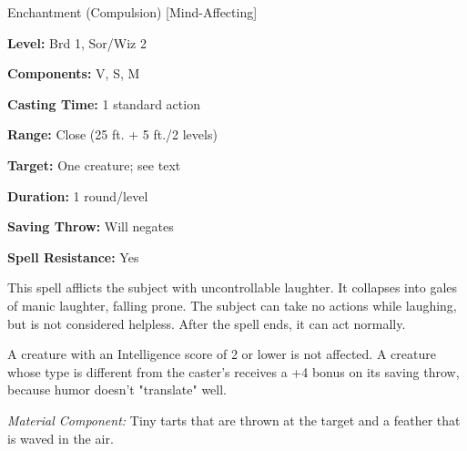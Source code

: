 
Enchantment (Compulsion) [Mind-Affecting]

\textbf{Level:} Brd 1, Sor/Wiz 2

\textbf{Components:} V, S, M

\textbf{Casting Time:} 1 standard action

\textbf{Range:} Close (25 ft. + 5 ft./2 levels)

\textbf{Target:} One creature; see text

\textbf{Duration:} 1 round/level

\textbf{Saving Throw:} Will negates

\textbf{Spell Resistance:} Yes

This spell afflicts the subject with uncontrollable laughter. It collapses into 
gales of manic laughter, falling prone. The subject can take no actions while laughing, 
but is not considered helpless. After the spell ends, it can act normally.

A creature with an Intelligence score of 2 or lower is not affected. A creature 
whose type is different from the caster's receives a +4 bonus on its saving throw, 
because humor doesn't "translate" well.

\textit{Material Component:} Tiny tarts that are thrown at the target and a feather 
that is waved in the air.


